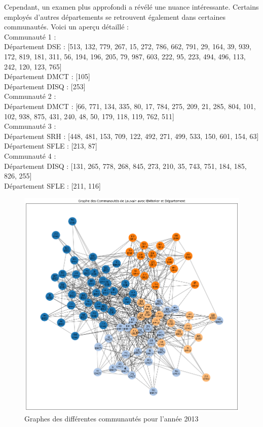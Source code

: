 \documentclass{article}
\begin{document}
Cependant, un examen plus approfondi a révélé une nuance intéressante. Certains employés d'autres départements se retrouvent également dans certaines communautés. Voici un aperçu détaillé : \\

\noindent
Communauté 1 : \\
Département DSE : [513, 132, 779, 267, 15, 272, 786, 662, 791, 29, 164, 39, 939, 172, 819, 181, 311, 56, 194, 196, 205, 79, 987, 603, 222, 95, 223, 494, 496, 113, 242, 120, 123, 765] \\
Département DMCT : [105] \\
Département DISQ : [253] \\

\noindent
Communauté 2 : \\
Département DMCT : [66, 771, 134, 335, 80, 17, 784, 275, 209, 21, 285, 804, 101, 102, 938, 875, 431, 240, 48, 50, 179, 118, 119, 762, 511] \\

\noindent
Communauté 3 : \\
Département SRH : [448, 481, 153, 709, 122, 492, 271, 499, 533, 150, 601, 154, 63] \\
Département SFLE : [213, 87] \\

\noindent
Communauté 4 : \\
Département DISQ : [131, 265, 778, 268, 845, 273, 210, 35, 743, 751, 184, 185, 826, 255] \\
Département SFLE : [211, 116] \\

\begin{figure}[!h]
    \centering
    \includegraphics[width=15cm]{assets/communaute/communaute_2013.png}
    \caption{Graphes des différentes communautés pour l'année 2013}
    \label{fig:communaute_2013}
\end{figure}
\end{document}
